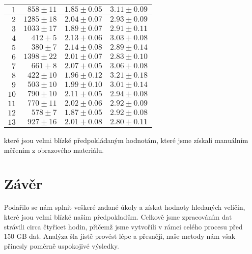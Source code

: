 \documentclass[czech,11pt,a4paper]{article}
\begin{document}
\begin{multicols}{2}
\begin{center}
\begin{tabular}{|r|r|r|r|}
				$1                                            $&$ 858\pm11  $&$ 1.85\pm0.05 $&$ 3.11\pm0.09 $\\ \hline
				$2 $ &$ 1285\pm18 $&$ 2.04\pm0.07 $&$ 2.93\pm0.09 $\\ \hline
				$3                                            $&$ 1033\pm17 $&$ 1.89\pm0.07 $& $ 2.91\pm0.11 $\\ \hline
				$4 $&$ 412\pm5   $&$ 2.13\pm0.06 $&$ 3.03\pm0.08 $\\ \hline
				$5                                            $&$ 380\pm7   $&$ 2.14\pm0.08 $&$ 2.89\pm0.14 $\\ \hline
				$6                                            $&$ 1398\pm22 $&$ 2.01\pm0.07 $&$ 2.83\pm0.10 $\\ \hline
				$7                                            $&$ 661\pm8   $&$ 2.07\pm0.05 $&$ 3.06\pm0.08 $\\ \hline
				$8                                            $&$ 422\pm10  $&$ 1.96\pm0.12 $&$ 3.21\pm0.18 $\\ \hline
				$9                                           $&$ 503\pm10  $&$ 1.99\pm0.10 $&$ 3.01\pm0.14 $\\ \hline
				$10                                           $&$ 790\pm10  $&$ 2.11\pm0.05 $&$ 2.94\pm0.08 $\\ \hline
				$11                                           $&$ 770\pm11  $&$ 2.02\pm0.06 $&$ 2.92\pm0.09 $\\ \hline
				$12                                          $&$ 578\pm7   $&$ 1.87\pm0.05 $&$ 2.92\pm0.08 $\\ \hline
				$13                                           $&$ 927\pm16  $&$ 2.01\pm0.08 $&$ 2.80\pm0.11$ \\ \hline
			\end{tabular}
		\end{center}
		které jsou velmi blízké předpokládaným hodnotám, které jsme získali manuálním měřením z obrazového materiálu.
		
		\section{Závěr}
		Podařilo se nám splnit veškeré zadané úkoly a získat hodnoty hledaných veličin, které jsou velmi blízké našim předpokladům. Celkově jsme zpracováním dat strávili circa čtyřicet hodin, přičemž jsme vytvořili v rámci celého procesu před 150 GB dat. Analýza šla jistě provést lépe a přesněji, naše metody nám však přinesly poměrně uspokojivé výsledky.
	

\end{multicols}
\end{document}
